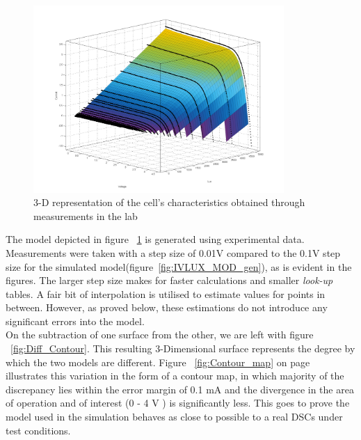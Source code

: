 \begin{figure}[H]
	  \begin{center}
		  \includegraphics[width=0.85\textwidth]{images/IVLUX_LAB_measured}
		  \caption{3-D representation of the cell's characteristics obtained through measurements in the lab }
		  \label{fig:IVLUX_LAB_measured}
	  \end{center}
  \end{figure}
The model depicted in figure ~\ref{fig:IVLUX_LAB_measured} is generated using experimental data. Measurements were taken with a step size of 0.01V compared to the 0.1V step size for the simulated model(figure~\ref{fig:IVLUX_MOD_gen}), as is evident in the figures. The larger step size makes for faster calculations and smaller \textit{look-up} tables. A fair bit of interpolation is utilised to estimate values for points in between. However, as proved below, these estimations do not introduce any significant errors into the model.\\

On the subtraction of one surface from the other, we are left with figure ~\ref{fig:Diff_Contour}. This resulting 3-Dimensional surface represents the degree by which the two models are different. Figure ~\ref{fig:Contour_map} on page ~\pageref{fig:Contour_map} illustrates this variation in the form of a contour map, in which majority of the discrepancy lies within the error margin of 0.1 mA and the divergence in the area of operation and of interest (0 - 4 V ) is significantly less. This goes to prove the model used in the simulation behaves as close to possible to a real \ac{DSCs} under test conditions.

